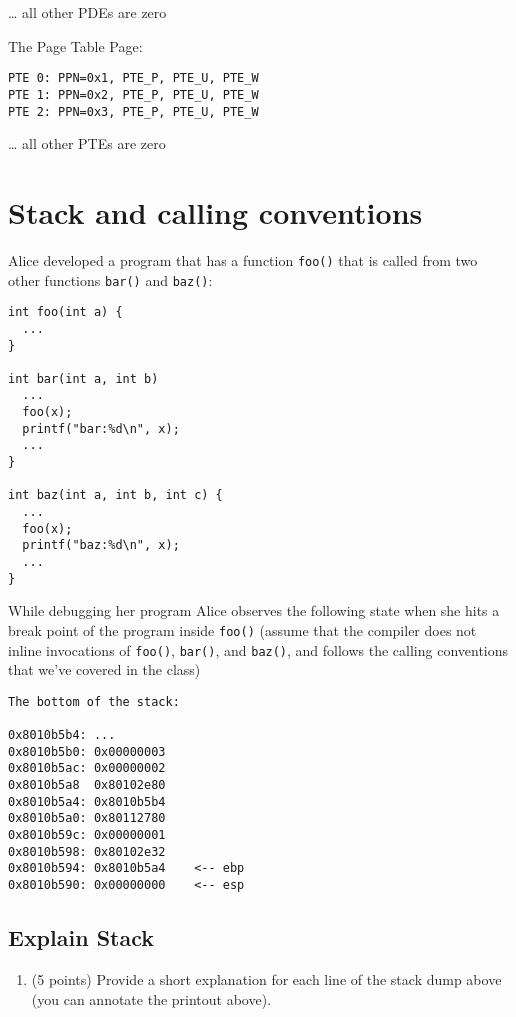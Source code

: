 \documentclass[]{article}
\providecommand{\tightlist}{%
  \setlength{\itemsep}{0pt}\setlength{\parskip}{0pt}}
\begin{document}
\ldots{} all other PDEs are zero

The Page Table Page:

\begin{verbatim}
PTE 0: PPN=0x1, PTE_P, PTE_U, PTE_W
PTE 1: PPN=0x2, PTE_P, PTE_U, PTE_W
PTE 2: PPN=0x3, PTE_P, PTE_U, PTE_W
\end{verbatim}

\ldots{} all other PTEs are zero

\hypertarget{stack-and-calling-conventions}{%
\section{Stack and calling
conventions}\label{stack-and-calling-conventions}}

Alice developed a program that has a function \texttt{foo()} that is
called from two other functions \texttt{bar()} and \texttt{baz()}:

\begin{verbatim}
int foo(int a) {
  ...
}

int bar(int a, int b) 
  ...
  foo(x);
  printf("bar:%d\n", x);
  ...
}

int baz(int a, int b, int c) {
  ...
  foo(x);
  printf("baz:%d\n", x);
  ...
}
\end{verbatim}

While debugging her program Alice observes the following state when she
hits a break point of the program inside \texttt{foo()} (assume that the
compiler does not inline invocations of \texttt{foo()}, \texttt{bar()},
and \texttt{baz()}, and follows the calling conventions that we've
covered in the class)

\begin{verbatim}
The bottom of the stack:

0x8010b5b4: ...
0x8010b5b0: 0x00000003
0x8010b5ac: 0x00000002
0x8010b5a8  0x80102e80
0x8010b5a4: 0x8010b5b4
0x8010b5a0: 0x80112780
0x8010b59c: 0x00000001
0x8010b598: 0x80102e32
0x8010b594: 0x8010b5a4    <-- ebp
0x8010b590: 0x00000000    <-- esp
\end{verbatim}

\hypertarget{explain-stack}{%
\subsection{Explain Stack}\label{explain-stack}}

\begin{enumerate}
\def\labelenumi{(\alph{enumi})}
\tightlist
\item
  (5 points) Provide a short explanation for each line of the stack dump
  above (you can annotate the printout above).
\end{enumerate}
\end{document}
